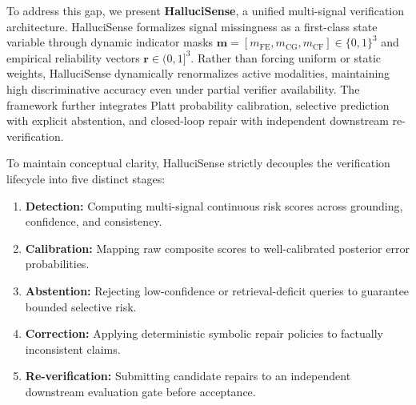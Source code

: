 \documentclass[11pt,a4paper]{article}
\begin{document}
To address this gap, we present \textbf{HalluciSense}, a unified multi-signal verification architecture. HalluciSense formalizes signal missingness as a first-class state variable through dynamic indicator masks $\mathbf{m} = [m_{\text{FE}}, m_{\text{CG}}, m_{\text{CF}}] \in \{0, 1\}^3$ and empirical reliability vectors $\mathbf{r} \in (0, 1]^3$. Rather than forcing uniform or static weights, HalluciSense dynamically renormalizes active modalities, maintaining high discriminative accuracy even under partial verifier availability. The framework further integrates Platt probability calibration, selective prediction with explicit abstention, and closed-loop repair with independent downstream re-verification.

To maintain conceptual clarity, HalluciSense strictly decouples the verification lifecycle into five distinct stages:
\begin{enumerate}
    \item \textbf{Detection:} Computing multi-signal continuous risk scores across grounding, confidence, and consistency.
    \item \textbf{Calibration:} Mapping raw composite scores to well-calibrated posterior error probabilities.
    \item \textbf{Abstention:} Rejecting low-confidence or retrieval-deficit queries to guarantee bounded selective risk.
    \item \textbf{Correction:} Applying deterministic symbolic repair policies to factually inconsistent claims.
    \item \textbf{Re-verification:} Submitting candidate repairs to an independent downstream evaluation gate before acceptance.
\end{enumerate}
\end{document}
